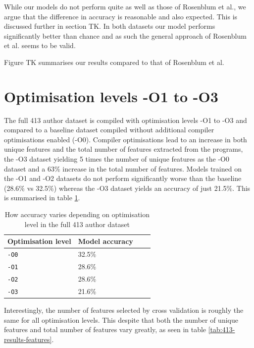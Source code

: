 \documentclass[a4paper,11pt]{kth-mag}
\begin{document}
While our models do not perform quite as well as those of Rosenblum et al.,  we
argue that the difference in accuracy is reasonable and also expected. This is
discussed further in section TK. In both datasets our model performs
significantly better than chance and as such the general approach of Rosenblum
et al. seems to be valid.

Figure TK summarises our results compared to that of Rosenblum et al.

\section{Optimisation levels -O1 to -O3}
The full 413 author dataset is compiled with optimisation levels -O1 to -O3 and
compared to a baseline dataset compiled without additional compiler
optimisations enabled (-O0). Compiler optimisations lead to an increase in both
unique features and the total number of features extracted from the programs,
the -O3 dataset yielding 5 times the number of unique features as the -O0
dataset and a 63\% increase in the total number of features. Models trained on
the -O1 and -O2 datasets do not perform significantly worse than the baseline
(28.6\% vs 32.5\%) whereas the -O3 dataset yields an accuracy of just 21.5\%.
This is summarised in table \ref{tab:413-results}.

\begin{table}[!htb]
    \centering
        \begin{tabular}{ l l l l }
        Optimisation level & Model accuracy \\
        \hline
        \lstinline{-O0} & 32.5\% \\
        \lstinline{-O1} & 28.6\% \\
        \lstinline{-O2} & 28.6\% \\
        \lstinline{-O3} & 21.6\%
        \end{tabular}
    \caption{How accuracy varies depending on optimisation level in the full
    413 author dataset}
    \label{tab:413-results}
\end{table}

Interestingly, the number of features selected by cross validation is roughly
the same for all optimisation levels. This despite that both the number of
unique features and total number of features vary greatly, as seen in table
\ref{tab:413-results-features}.
\end{document}
